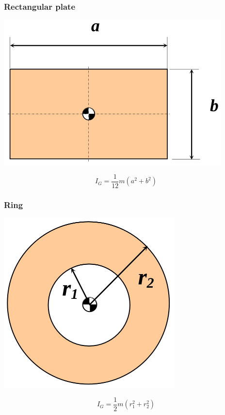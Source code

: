 \documentclass[11pt]{article}
\begin{document}
\subsubsection{Rectangular plate}
\label{sec:orgcb95ee4}
\begin{center}
\includegraphics[width=.9\linewidth]{./images/moment-of-inertia-rectangular-plate-diagram.png}
\end{center}
\[I_G = \frac{1}{12} m (a^2 + b^2)\]
\subsubsection{Ring}
\label{sec:org6729b00}
\begin{center}
\includegraphics[width=.9\linewidth]{./images/moment-of-inertia-ring-diagram.png}
\end{center}
\[I_G = \frac{1}{2} m (r_1^2 + r_2^2)\]
\end{document}
